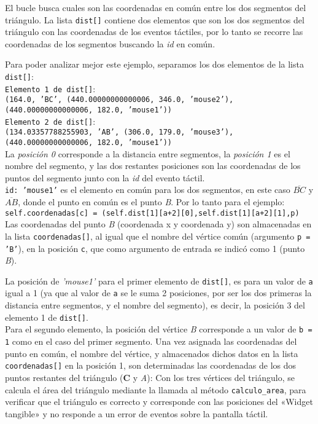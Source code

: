 El bucle busca cuales son las coordenadas en común entre los dos segmentos del triángulo. La lista \texttt{dist[]} contiene dos elementos que son los dos segmentos del triángulo con las coordenadas de los eventos táctiles, por lo tanto se recorre las coordenadas de los segmentos buscando la \textit{id} en común. 

Para poder analizar mejor este ejemplo, separamos los dos elementos de la lista \texttt{dist[]}:\\

\texttt{Elemento 1 de dist[]}:\\
\texttt{(164.0, 'BC', (440.00000000000006, 346.0, 'mouse2'), (440.00000000000006, 182.0, 'mouse1'))}\\

\texttt{Elemento 2 de dist[]}:\\
\texttt{(134.03357788255903, 'AB', (306.0, 179.0, 'mouse3'), (440.00000000000006, 182.0, 'mouse1'))}\\

La \textit{posición 0} corresponde a la distancia entre segmentos, la \textit{posición 1} es el nombre del segmento, y las dos restantes posiciones son las coordenadas de los puntos del segmento junto con la \textit{id} del evento táctil.\\

\texttt{id: 'mouse1'} es el elemento en común para los dos segmentos, en este caso $\overline{BC}$ y $\overline{AB}$, donde el punto en común es el punto \textit{B}. Por lo tanto para el ejemplo:\\

\texttt{self.coordenadas[c] = (self.dist[1][a+2][0],self.dist[1][a+2][1],p)}\\

Las coordenadas del punto \textit{B} (coordenada x y coordenada y) son almacenadas en la lista \texttt{coordenadas[]}, al igual que el nombre del vértice común (argumento \texttt{p = 'B'}), en la posición \texttt{c}, que como argumento de entrada se indicó como 1 (punto \textit{B}). 

La posición de \textit{'mouse1'} para el primer elemento de \texttt{dist[]}, es para un valor de \texttt{a} igual a 1 (ya que al valor de \texttt{a} se le suma 2 posiciones, por ser los dos primeras la distancia entre segmentos, y el nombre del segmento), es decir, la posición 3 del elemento 1 de \texttt{dist[]}.\\

Para el segundo elemento, la posición del vértice \textit{B} corresponde a un valor de \texttt{b = 1} como en el caso del primer segmento.
Una vez asignada las coordenadas del punto en común, el nombre del vértice, y almacenados dichos datos en la lista \texttt{coordenadas[]} en la posición 1, son determinadas las coordenadas de los dos puntos restantes del triángulo (\textbf{C} y \textit{A}): 
Con los tres vértices del triángulo, se calcula el área del triángulo mediante la llamada al método \texttt{calculo\_area}, para verificar que el triángulo es correcto y corresponde con las posiciones del «Widget tangible» y no responde a un error de eventos sobre la pantalla táctil.\\

